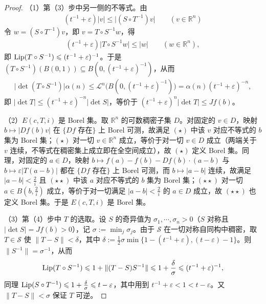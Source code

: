 \documentclass[../../main.tex]{subfiles}%
\begin{document}
\begin{proof}
（1）第（3）步中另一侧的不等式。由
\begin{align*}
(t^{-1}+\varepsilon)\lvert v\rvert\leqslant\lvert(S\circ T^{-1})v\rvert\qquad(v\in\mathbb{R}^n)
\end{align*}
令 $w=(S\circ T^{-1})v$，即 $v=T\circ S^{-1}w$，得
\begin{align*}
(t^{-1}+\varepsilon)\lvert T\circ S^{-1}w\rvert\leqslant\lvert w\rvert\qquad(w\in\mathbb{R}^n),
\end{align*}
即 $\operatorname{Lip}(T\circ S^{-1})\leqslant(t^{-1}+\varepsilon)^{-1}$。于是 $(T\circ S^{-1})(B(0,1))\subseteq B(0,(t^{-1}+\varepsilon)^{-1})$，从而
\begin{align*}
\lvert\det(T\circ S^{-1})\rvert\alpha(n)\leqslant\mathcal{L}^n\bigl(B(0,(t^{-1}+\varepsilon)^{-1})\bigr)=\alpha(n)(t^{-1}+\varepsilon)^{-n},
\end{align*}
即 $\lvert\det T\rvert\leqslant(t^{-1}+\varepsilon)^{-n}\lvert\det S\rvert$，等价于 $(t^{-1}+\varepsilon)^n\lvert\det T\rvert\leqslant Jf(b)$。

（2）$E(c,T,i)$ 是 Borel 集。取 $\mathbb{R}^n$ 的可数稠密子集 $D$。对固定的 $v\in D$，映射 $b\mapsto\lvert Df(b)v\rvert$ 在 $\{Df\text{ 存在}\}$ 上 Borel 可测，故满足 $(\star)$ 中该 $v$ 对应不等式的 $b$ 集为 Borel 集；$(\star)$ 对一切 $v\in\mathbb{R}^n$ 成立，等价于对一切 $v\in D$ 成立（两端关于 $v$ 连续，不等式在稠密集上成立即在全空间成立），故 $(\star)$ 定义 Borel 集。同理，对固定的 $a\in D$，映射 $b\mapsto f(a)-f(b)-Df(b)\cdot(a-b)$ 与 $b\mapsto\varepsilon\lvert T(a-b)\rvert$ 都在 $\{Df\text{ 存在}\}$ 上 Borel 可测，而 $b\mapsto\lvert a-b\rvert$ 连续，故满足 $\lvert a-b\rvert<\frac2i$ 且 $(\star\star)$ 中该 $a$ 对应不等式的 $b$ 集为 Borel 集；$(\star\star)$ 对一切 $a\in B(b,\frac2i)$ 成立，等价于对一切满足 $\lvert a-b\rvert<\frac2i$ 的 $a\in D$ 成立，故 $(\star\star)$ 也定义 Borel 集。于是 $E(c,T,i)$ 是 Borel 集。

（3）第（4）步中 $T$ 的选取。设 $S$ 的奇异值为 $\sigma_1,\cdots,\sigma_n>0$（$S$ 对称且 $\lvert\det S\rvert=Jf(b)>0$），记 $\sigma:=\min_j\sigma_j$。由于 $\mathcal{S}$ 在一切对称自同构中稠密，取 $T\in\mathcal{S}$ 使 $\lVert T-S\rVert<\delta$，其中 $\delta:=\frac12\sigma\min\{1-(t^{-1}+\varepsilon),(t-\varepsilon)-1\}$。则 $\lVert S^{-1}\rVert=\sigma^{-1}$，从而
\begin{align*}
\operatorname{Lip}(T\circ S^{-1})\leqslant1+\lVert(T-S)S^{-1}\rVert\leqslant1+\frac{\delta}{\sigma}\leqslant(t^{-1}+\varepsilon)^{-1},
\end{align*}
同理 $\operatorname{Lip}(S\circ T^{-1})\leqslant1+\frac{\delta}{\sigma}\leqslant t-\varepsilon$，其中用到 $t^{-1}+\varepsilon<1<t-\varepsilon$。又 $\lVert T-S\rVert<\sigma$ 保证 $T$ 可逆。


\end{proof}
\end{document}
